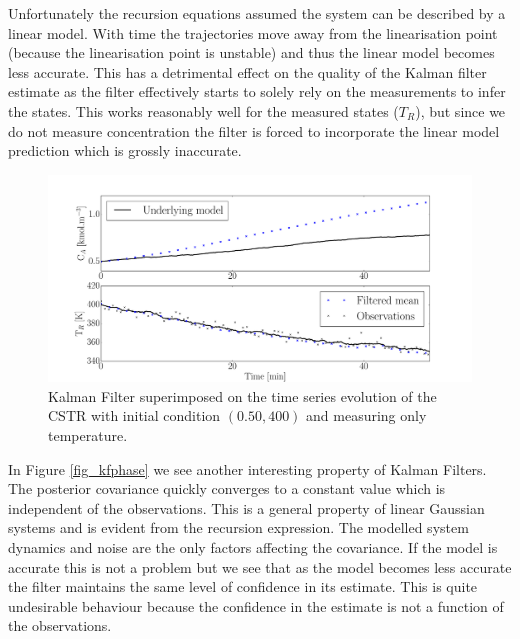 \documentclass[../masters.tex]{subfiles}
\begin{document}
Unfortunately the recursion equations assumed the system can be described by a linear model. With time the trajectories move away from the linearisation point (because the linearisation point is unstable) and thus the linear model becomes less accurate. This has a detrimental effect on the quality of the Kalman filter estimate as the filter effectively starts to solely rely on the measurements to infer the states. This works reasonably well for the measured states ($T_R$), but since we do not measure concentration the filter is forced to incorporate the linear model prediction which is grossly inaccurate. 
\begin{figure}[H] 
\centering
\includegraphics[scale=0.30]{kalman_filter_timeseries_M1.pdf}
\caption{Kalman Filter superimposed on the time series evolution of the CSTR with initial condition $(0.50, 400)$ and measuring only temperature.}
\label{fig_kftimeseries}
\end{figure}
In Figure \ref{fig_kfphase} we see another interesting property of Kalman Filters. The posterior covariance quickly converges to a constant value which is independent of the observations. This is a general property of linear Gaussian systems \cite{barber} and is evident from the recursion expression. The modelled system dynamics and noise are the only factors affecting the covariance. If the model is accurate this is not a problem but we see that as the model becomes less accurate the filter maintains the same level of confidence in its estimate. This is quite undesirable behaviour because the confidence in the estimate is not a function of the observations. 
\end{document}
